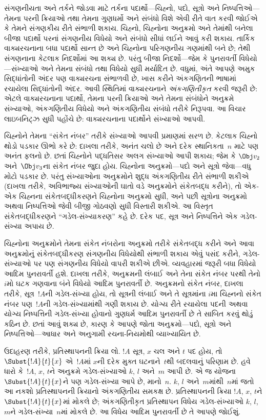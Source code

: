 સંગણનીયતા અને તર્કને જોડવા માટે તર્કના
પદાર્થો—ચિહ્નો, પદો, સૂત્રો અને
નિષ્પત્તિઓ—તેમના પરની ક્રિયાઓ તથા
તેમના ગુણધર્મો અને સંબંધો વિશે એવી રીતે
વાત કરવી જોઈએ કે તેમને સંગણકીય રીતે
સંભાળી શકાય. ચિહ્નો, ચિહ્નોના અનુક્રમો
અને તેમાંથી બનેલા બીજા પદાર્થો પરનાં
સંગણનીય વિધેયો અને સંબંધો સીધાં લઈને
આવું કરી શકાય. તાર્કિક વાક્યરચનાના
બધા પદાર્થો સાન્ત છે અને ચિહ્નોના
પરિગણનીય ગણમાંથી બને છે; તેથી
સંગણનાના કેટલાક નિદર્શોમાં આ શક્ય છે.
પરંતુ બીજા નિદર્શો—જેમ કે પુનરાવર્તી
વિધેયો—સંખ્યાઓ અને તેમના સંબંધો તથા
વિધેયો સુધી મર્યાદિત છે. વધુમાં, અંતે
આપણે અમુક સિદ્ધાંતોની અંદર પણ વાક્યરચના
સંભાળવી છે, ખાસ કરીને અંકગણિતની ભાષામાં
રચાયેલા સિદ્ધાંતોની અંદર. આવી સ્થિતિમાં
વાક્યરચનાને \emph{અંકગણિતીકૃત} કરવી
જરૂરી છે: એટલે વાક્યરચનાના પદાર્થો,
તેમના પરની ક્રિયાઓ અને તેમના સંબંધોને
અનુક્રમે સંખ્યાઓ, અંકગણિતીય વિધેયો અને
અંકગણિતીય સંબંધો તરીકે નિરૂપવા. આ
વિચાર લાઇબનિટ્ઝ સુધી પહોંચે છે: વાક્યરચનાના
પદાર્થોને સંખ્યાઓ આપવી.

ચિહ્નોને તેમના ``સંકેત નંબર'' તરીકે સંખ્યાઓ
આપવી પ્રમાણમાં સરળ છે. કેટલાક ચિહ્નો
થોડો પડકાર ઊભો કરે છે: દાખલા તરીકે,
અનંત ચલો છે અને દરેક
સ્થાનિકતા~$n$ માટે પણ અનંત
ફલનો છે. છતાં ચિહ્નોને પદ્ધતિસર
અલગ સંખ્યાઓ આપી શકાય; જેમ કે
$\Obj v_2$ અને~$\Obj v_3$ના સંકેત
નંબર જુદા હોય. ચિહ્નોના અનુક્રમો—પદો
અને સૂત્રો જેવા—વધુ મોટો પડકાર
છે. પરંતુ સંખ્યાઓના અનુક્રમોને શુદ્ધ
અંકગણિતીય રીતે સંભાળી શકીએ (દાખલા તરીકે,
અવિભાજ્ય સંખ્યાઓની ઘાતો વડે અનુક્રમોને
સંકેતબદ્ધ કરીને), તો એક-એક ચિહ્નના
સંકેતબદ્ધીકરણને ચિહ્નોના અનુક્રમો સુધી,
અને પછી સૂત્રોના અનુક્રમો અથવા
નિષ્પત્તિઓ જેવી બીજી ગોઠવણો સુધી
વિસ્તારી શકીએ. આ વિસ્તૃત સંકેતબદ્ધીકરણને
``ગડેલ-સંખ્યાકરણ'' કહે છે. દરેક પદ,
સૂત્ર અને નિષ્પત્તિને એક
ગડેલ-સંખ્યા અપાય છે.

ચિહ્નોના અનુક્રમોને તેમના સંકેત નંબરોના
અનુક્રમો તરીકે સંકેતબદ્ધ કરીને અને આવા
અનુક્રમોનું સંકેતબદ્ધીકરણ સંગણનીય વિધેયોથી
સંભાળી શકાય એવું પસંદ કરીને, ગડેલ-સંખ્યાઓ
પર પણ સંગણનીય વિધેયો વાપરી શકીએ છીએ.
વ્યવહારમાં જરૂરી બધા વિધેયો આદિમ
પુનરાવર્તી હશે. દાખલા તરીકે, અનુક્રમની
લંબાઈ અને તેના સંકેત નંબર પરથી તેનો
$i$મો ઘટક ગણવાના બંને વિધેયો આદિમ
પુનરાવર્તી છે. અનુક્રમનો સંકેત નંબર,
દાખલા તરીકે, સૂત્ર~$!A$ની
ગડેલ-સંખ્યા હોય, તો સૂત્રની
લંબાઈ અને તે સૂત્રમાંના $i$મા ચિહ્નનો સંકેત
નંબર પણ~$!A$ની ગડેલ-સંખ્યામાંથી
ગણી શકાય છે. યોગ્ય રીતે રચાયેલા પદની
અથવા યોગ્ય નિષ્પત્તિની ગડેલ-સંખ્યા
હોવાનો ગુણધર્મ આદિમ પુનરાવર્તી છે તે
સાબિત કરવું થોડું કઠિન છે. છતાં આવું
શક્ય છે, કારણ કે આપણે જોતા અનુક્રમો—પદો,
સૂત્રો અને નિષ્પત્તિઓ—આધાર અને
અનુગામી રચના-નિયમોથી વ્યાખ્યાયિત છે.

ઉદાહરણ તરીકે, પ્રતિસ્થાપનની ક્રિયા લો.
$!A$ સૂત્ર, $x$ ચલ અને $t$ પદ હોય,
તો~$\Subst{!A}{t}{x}$ એ~$!A$માં
$x$ની દરેક મુક્ત ઘટનાને~$t$થી
બદલવાનું પરિણામ છે. હવે ધારો કે~$!A$,
$x$, $t$ને અનુક્રમે ગડેલ-સંખ્યાઓ
$k$, $l$ અને~$m$ આપી છે. એ જ
યોજના~$\Subst{!A}{t}{x}$ને પણ
ગડેલ-સંખ્યા આપે છે, માનો~$n$.
$k$, $l$ અને~$m$માંથી~$n$માં
જતો આ નકશો પ્રતિસ્થાપનની ક્રિયાનો
અંકગણિતીય સમકક્ષ છે. પ્રતિસ્થાપનની
ક્રિયા $!A$, $x$, $t$ને
$\Subst{!A}{t}{x}$માં મોકલે છે;
અંકગણિતીકૃત પ્રતિસ્થાપન વિધેય
ગડેલ-સંખ્યાઓ $k$, $l$, $m$ને
ગડેલ-સંખ્યા~$n$માં મોકલે છે.
આ વિધેય આદિમ પુનરાવર્તી છે તે આપણે
જોઈશું.

